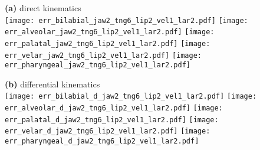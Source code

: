 \documentclass[varwidth=7.5in]{standalone}
\begin{document}
\raggedright

{\bf (a)} direct kinematics\\
\texttt{[image: err\_bilabial\_jaw2\_tng6\_lip2\_vel1\_lar2.pdf]}%
\texttt{[image: err\_alveolar\_jaw2\_tng6\_lip2\_vel1\_lar2.pdf]}%
\texttt{[image: err\_palatal\_jaw2\_tng6\_lip2\_vel1\_lar2.pdf]}%
\texttt{[image: err\_velar\_jaw2\_tng6\_lip2\_vel1\_lar2.pdf]}%
\texttt{[image: err\_pharyngeal\_jaw2\_tng6\_lip2\_vel1\_lar2.pdf]}

{\bf (b)} differential kinematics\\
\texttt{[image: err\_bilabial\_d\_jaw2\_tng6\_lip2\_vel1\_lar2.pdf]}%
\texttt{[image: err\_alveolar\_d\_jaw2\_tng6\_lip2\_vel1\_lar2.pdf]}%
\texttt{[image: err\_palatal\_d\_jaw2\_tng6\_lip2\_vel1\_lar2.pdf]}%
\texttt{[image: err\_velar\_d\_jaw2\_tng6\_lip2\_vel1\_lar2.pdf]}%
\texttt{[image: err\_pharyngeal\_d\_jaw2\_tng6\_lip2\_vel1\_lar2.pdf]}
\end{document}
